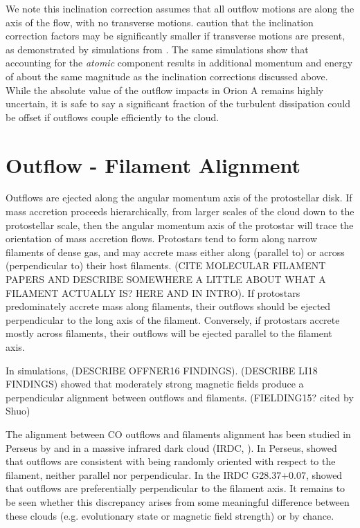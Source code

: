 \documentclass[twocolumn]{aastex63}
\begin{document}
We note this inclination correction assumes that all outflow motions are along the axis of the flow, with no transverse motions. \citet{Dunham14} caution that the inclination correction factors may be significantly smaller if transverse motions are present, as demonstrated by simulations from \citet{Downes07}. The same simulations show that accounting for the \emph{atomic} component results in additional momentum and energy of about the same magnitude as the inclination corrections discussed above. While the absolute value of the outflow impacts in Orion A remains highly uncertain, it is safe to say a significant fraction of the turbulent dissipation could be offset if outflows couple efficiently to the cloud. %

\section{Outflow - Filament Alignment}\label{sec:filaments}
Outflows are ejected along the angular momentum axis of the protostellar disk. If mass accretion proceeds hierarchically, from larger scales of the cloud down to the protostellar scale, then the angular momentum axis of the protostar will trace the orientation of mass accretion flows. Protostars tend to form along narrow filaments of dense gas, and may accrete mass either along (parallel to) or across (perpendicular to) their host filaments. (CITE MOLECULAR FILAMENT PAPERS AND DESCRIBE SOMEWHERE A LITTLE ABOUT WHAT A FILAMENT ACTUALLY IS? HERE AND IN INTRO). If protostars predominately accrete mass along filaments, their outflows should be ejected perpendicular to the long axis of the filament. Conversely, if protostars accrete mostly across filaments, their outflows will be ejected parallel to the filament axis. 


In simulations, \citet{Offner16} (DESCRIBE OFFNER16 FINDINGS). \citet{Li18} (DESCRIBE LI18 FINDINGS) showed that moderately strong magnetic fields produce a perpendicular alignment between outflows and filaments.  (FIELDING15? cited by Shuo)

The alignment between CO outflows  and filaments alignment has been studied in Perseus by \citet{Stephens17} and in a massive infrared dark cloud (IRDC, \citealp{Kong19}). In Perseus, \citet{Stephens17} showed that outflows are consistent with being randomly oriented with respect to the filament, neither parallel nor perpendicular. In the IRDC G28.37+0.07, \cite{Kong19} showed that outflows are preferentially perpendicular to the filament axis. It remains to be seen whether this discrepancy arises from some meaningful difference between these clouds (e.g. evolutionary state or magnetic field strength) or by chance. 
\end{document}
